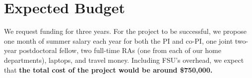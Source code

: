 \documentclass[11pt]{article}
\begin{document}
\section{Expected Budget}
We request funding for three years.  For the project to be successful,
we propose one month of summer salary each year for both the PI and
co-PI, one joint two-year postdoctoral fellow, two full-time RAs (one
from each of our home departments), laptops, and travel money.
Including FSU's overhead, we expect that {\bf the total cost of the
project would be around \$750,000.}




\footnotesize{}
\end{document}
